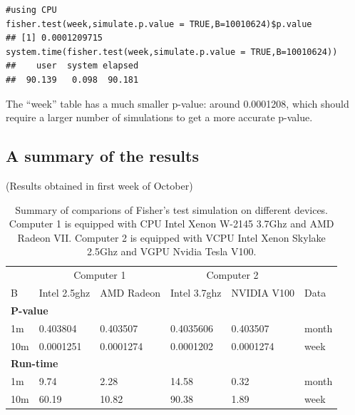 \documentclass[article,nojss]{jss}\usepackage[]{graphicx}\usepackage[]{color}
\makeatletter
\newenvironment{kframe}{%
 \def\at@end@of@kframe{}%
 \ifinner\ifhmode%
  \def\at@end@of@kframe{\end{minipage}}%
  \begin{minipage}{\columnwidth}%
 \fi\fi%
 \def\FrameCommand##1{\hskip\@totalleftmargin \hskip-\fboxsep
 \colorbox{shadecolor}{##1}\hskip-\fboxsep
     \hskip-\linewidth \hskip-\@totalleftmargin \hskip\columnwidth}%
 \MakeFramed {\advance\hsize-\width
   \@totalleftmargin\z@ \linewidth\hsize
   \@setminipage}}%
 {\par\unskip\endMakeFramed%
 \at@end@of@kframe}
\newenvironment{knitrout}{}{} %
\makeatother
\begin{document}
\begin{knitrout}
\color{fgcolor}\begin{kframe}
\begin{verbatim}
#using CPU
fisher.test(week,simulate.p.value = TRUE,B=10010624)$p.value
## [1] 0.0001209715
system.time(fisher.test(week,simulate.p.value = TRUE,B=10010624))
##    user  system elapsed 
##  90.139   0.098  90.181
\end{verbatim}
\end{kframe}
\end{knitrout}
The ``week'' table has a much smaller p-value: around 0.0001208, which should require a larger number of simulations to get a more accurate p-value.

\subsection{A summary of the results}
(Results obtained in first week of October)
\begin{knitrout}
\color{fgcolor}\begin{table}[H]

\caption{\label{tab:summarycompare}Summary of comparions of Fisher's test simulation on different devices. Computer 1 is equipped with CPU Intel Xenon W-2145 3.7Ghz and AMD Radeon VII. Computer 2 is equipped with	VCPU Intel Xenon Skylake 2.5Ghz and VGPU Nvidia Tesla V100.\label{tab:summary}}
\centering
\begin{tabular}[t]{l|l|l|l|l|l}
\hline
\multicolumn{1}{c|}{ } & \multicolumn{2}{c|}{Computer 1} & \multicolumn{2}{c|}{Computer 2} & \multicolumn{1}{c}{ } \\
\cline{2-3} \cline{4-5}
B & Intel 2.5ghz & AMD Radeon & Intel 3.7ghz & NVIDIA V100 & Data\\
\hline
\multicolumn{6}{l}{\textbf{P-value}}\\
\hline
\hspace{1em}1m & 0.403804 & 0.403507 & 0.4035606 & 0.403507 & month\\
\hline
\hspace{1em}10m & 0.0001251 & 0.0001274 & 0.0001202 & 0.0001274 & week\\
\hline
\multicolumn{6}{l}{\textbf{Run-time}}\\
\hline
\hspace{1em}1m & 9.74 & 2.28 & 14.58 & 0.32 & month\\
\hline
\hspace{1em}10m & 60.19 & 10.82 & 90.38 & 1.89 & week\\
\hline
\end{tabular}
\end{table}

\end{knitrout}
\end{document}
